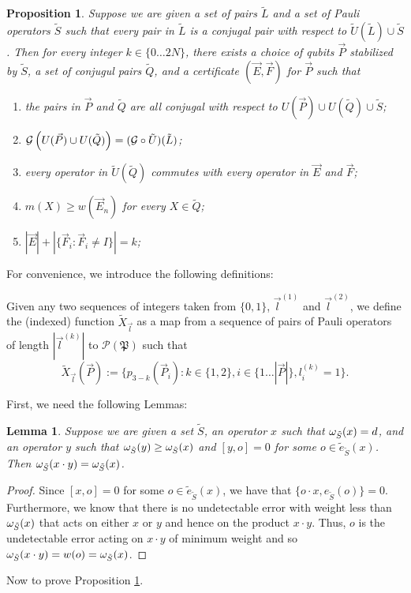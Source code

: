 \documentclass[twocolumn,showpacs,preprintnumbers,amsmath,amssymb,nofootinbib,pra,floatfix]{revtex4-1}
\newtheorem{proposition}{Proposition}
\newtheorem{lemma}{Lemma}
\newenvironment{definition}[1][Definition]{\begin{trivlist}
\item[\hskip \labelsep {\bfseries #1}]}{\end{trivlist}}
\newcommand{\lst}{\vec}
\newcommand{\set}{\tilde}
\newcommand{\genfun}{\mathcal{G}}
\newcommand{\pauligroup}{\mathfrak{P}}
\newcommand{\powerset}{\mathcal{P}}
\begin{document}
\begin{proposition}
\label{certificate-creation}
Suppose we are given a set of pairs $\set L$ and a set of Pauli operators $\set S$ such that every pair in $\set L$ is a conjugal pair with respect to $\set U(\set L)\cup\set S$.  Then for every integer $k\in\{0\dots 2N\}$, there exists a choice of qubits $\lst P$ stabilized by $\set S$, a set of conjugul pairs $\set Q$, and a certificate $(\lst E,\lst F)$ for $\lst P$ such that
\begin{enumerate}
\item the pairs in $\lst P$ and $\set Q$ are all conjugal with respect to $U(\lst P)\cup U(\set Q)\cup \set S$;
\item $\genfun\paren{U(\lst P)\cup U(\set Q)}=(\genfun\circ\set U)(\set L)$;
\item every operator in $\set U(\set Q)$ commutes with every operator in $\lst E$ and $\lst F$;
\item $m(X)\ge w(\lst E_n)$ for every $X\in\set Q$;
\item $|\lst E|+|\{\lst F_i : \lst F_i\ne I\}|=k$;
\end{enumerate}
\end{proposition}
For convenience, we introduce the following definitions:

\begin{definition}
Given any two sequences of integers taken from $\{0,1\}$, $\lst l^{(1)}$ and $\lst l^{(2)}$, we define the (indexed) function $\set X_{\lst l}$ as a map from a sequence of pairs of Pauli operators of length $|\lst l^{(k)}|$ to $\powerset(\pauligroup)$ such that
$$\set X_{\lst l}(\lst P) := \{p_{3-k}(\lst P_i) : k \in \{1,2\}, i \in \{1\dots |\lst P|\}, l^{(k)}_i=1\}.$$
\end{definition}
First, we need the following Lemmas:
\begin{lemma}
\label{unchanged-error-weight}
Suppose we are given a set $\set S$, an operator $x$ such that $\om_{\set S}(x)=d$, and an operator $y$ such that $\om_{\set S}(y) \ge \om_{\set S}(x)$ and $[y,o]=0$ for some $o\in\set e_{\set S}(x)$.  Then $\om_{\set S}(x\cdot y)=\om_{\set S}(x)$.
\end{lemma}

\begin{proof}
Since $[x,o]=0$ for some $o\in\set e_{\set S}(x)$, we have that $\{o\cdot x,e_{\set S}(o)\}=0$.  Furthermore, we know that there is no undetectable error with weight less than $\om_{\set S}(x)$ that acts on either $x$ or $y$ and hence on the product $x\cdot y$.  Thus, $o$ is the undetectable error acting on $x\cdot y$ of minimum weight and so $\om_{\set S}(x\cdot y)=w(o)=\om_{\set S}(x)$.
\end{proof}
Now to prove Proposition \ref{certificate-creation}.
\end{document}
